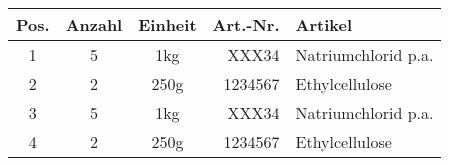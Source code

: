 \begin{longtable}{cccrX}
Pos. & Anzahl & Einheit & Art.-Nr. & Artikel\\
\endhead
\hline
1 & 5 & 1kg & XXX34 & Natriumchlorid p.a.\\
2 & 2 & 250g & 1234567 & Ethylcellulose\\
3 & 5 & 1kg & XXX34 & Natriumchlorid p.a.\\
4 & 2 & 250g & 1234567 & Ethylcellulose\\
\end{longtable}
